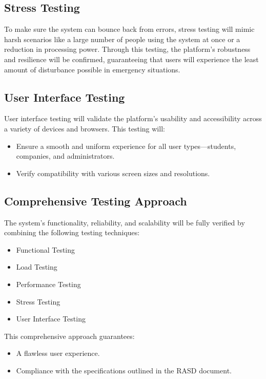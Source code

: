 \subsection{Stress Testing}
To make sure the system can bounce back from errors, stress testing will mimic harsh scenarios like a large number of people using the system at once or a reduction in processing power. Through this testing, the platform's robustness and resilience will be confirmed, guaranteeing that users will experience the least amount of disturbance possible in emergency situations.


\subsection{User Interface Testing}
User interface testing will validate the platform's usability and accessibility across a variety of devices and browsers. This testing will:
\begin{itemize}
    \item Ensure a smooth and uniform experience for all user types—students, companies, and administrators.
    \item Verify compatibility with various screen sizes and resolutions.
\end{itemize}

\subsection{Comprehensive Testing Approach}
The system's functionality, reliability, and scalability will be fully verified by combining the following testing techniques:
\begin{itemize}
    \item Functional Testing
    \item Load Testing
    \item Performance Testing
    \item Stress Testing
    \item User Interface Testing
\end{itemize}
This comprehensive approach guarantees:
\begin{itemize}
    \item A flawless user experience.
    \item Compliance with the specifications outlined in the RASD document.
\end{itemize}
